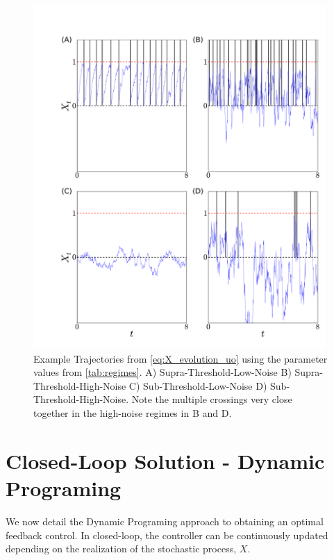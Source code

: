 \documentclass[12pt]{iopart}
\begin{document}
\begin{figure}[htp]
\begin{center}
  \includegraphics[width=0.99\textwidth]{Figs/PathSimulator/path_T=14_combined.pdf}
  \caption[labelInTOC]{Example Trajectories from \cref{eq:X_evolution_uo}
  using the parameter values from \cref{tab:regimes}. 
  A) Supra-Threshold-Low-Noise 
  B) Supra-Threshold-High-Noise 
  C) Sub-Threshold-Low-Noise
  D) Sub-Threshold-High-Noise. 
  Note the multiple crossings very close together in the high-noise regimes
  in B and D. }
  \label{fig:regime_path_examples}
\end{center}
\end{figure}

\section{Closed-Loop Solution - Dynamic Programing}
We now detail the Dynamic Programing approach to obtaining an optimal feedback
control. In closed-loop, the controller can be continuously updated depending on
the realization of the stochastic process, $X$.
\end{document}
